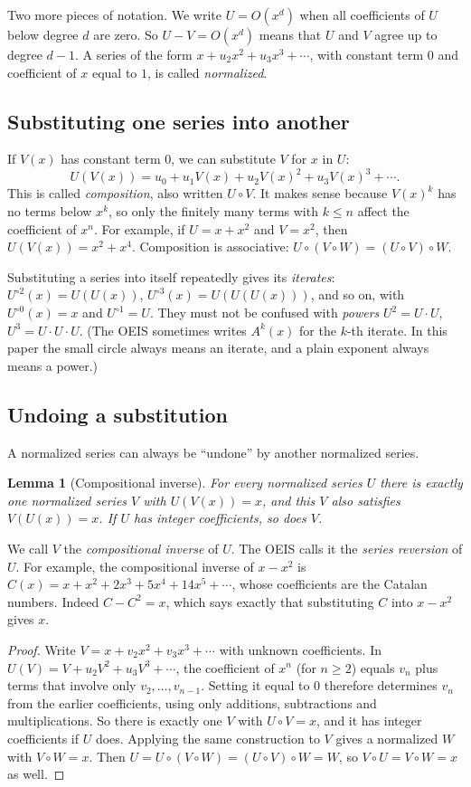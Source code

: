 \documentclass[11pt,a4paper]{article}
\newtheorem{lemma}[theorem]{Lemma}
\theoremstyle{definition}
\theoremstyle{remark}
\begin{document}
Two more pieces of notation. We write $U=O(x^d)$ when all coefficients of $U$ below degree $d$ are zero. So
$U-V=O(x^d)$ means that $U$ and $V$ agree up to degree $d-1$. A series of the form $x+u_2x^2+u_3x^3+\cdots$, with
constant term $0$ and coefficient of $x$ equal to $1$, is called \emph{normalized}.

\subsection{Substituting one series into another}
If $V(x)$ has constant term $0$, we can substitute $V$ for $x$ in $U$:
\[
U(V(x))=u_0+u_1V(x)+u_2V(x)^2+u_3V(x)^3+\cdots .
\]
This is called \emph{composition}, also written $U\circ V$. It makes sense because $V(x)^k$ has no terms below $x^k$,
so only the finitely many terms with $k\le n$ affect the coefficient of $x^n$. For example, if $U=x+x^2$ and $V=x^2$, then
$U(V(x))=x^2+x^4$. Composition is associative: $U\circ(V\circ W)=(U\circ V)\circ W$.

Substituting a series into itself repeatedly gives its \emph{iterates}: $U^{\circ2}(x)=U(U(x))$,
$U^{\circ3}(x)=U(U(U(x)))$, and so on, with $U^{\circ0}(x)=x$ and $U^{\circ1}=U$. They must not be confused with
\emph{powers} $U^2=U\cdot U$, $U^3=U\cdot U\cdot U$. (The OEIS sometimes writes $A^k(x)$ for the $k$-th iterate. In
this paper the small circle always means an iterate, and a plain exponent always means a power.)

\subsection{Undoing a substitution}
A normalized series can always be ``undone'' by another normalized series.

\begin{lemma}[Compositional inverse]\label{lem:inverse}
For every normalized series $U$ there is exactly one normalized series $V$ with $U(V(x))=x$, and this $V$ also
satisfies $V(U(x))=x$. If $U$ has integer coefficients, so does $V$.
\end{lemma}

We call $V$ the \emph{compositional inverse} of $U$. The OEIS calls it the \emph{series reversion} of $U$. For example,
the compositional inverse of $x-x^2$ is $C(x)=x+x^2+2x^3+5x^4+14x^5+\cdots$, whose coefficients are the Catalan numbers.
Indeed $C-C^2=x$, which says exactly that substituting $C$ into $x-x^2$ gives $x$.

\begin{proof}
Write $V=x+v_2x^2+v_3x^3+\cdots$ with unknown coefficients. In
$U(V)=V+u_2V^2+u_3V^3+\cdots$, the coefficient of $x^n$ (for $n\ge2$) equals $v_n$ plus terms that involve only
$v_2,\dots,v_{n-1}$. Setting it equal to $0$ therefore determines $v_n$ from the earlier coefficients, using only
additions, subtractions and multiplications. So there is exactly one $V$ with $U\circ V=x$, and it has integer
coefficients if $U$ does. Applying the same construction to $V$ gives a normalized $W$ with $V\circ W=x$. Then
$U=U\circ(V\circ W)=(U\circ V)\circ W=W$, so $V\circ U=V\circ W=x$ as well.
\end{proof}
\end{document}
